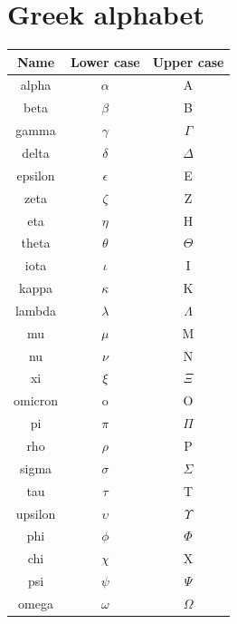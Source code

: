 \chapter{Greek alphabet}

\begin{tabular}{ |c|c|c| }
  \hline
  Name & Lower case & Upper case\\
  \hline
  alpha & $\alpha$ & A \\
	beta & $\beta$ & B\\
	gamma & $\gamma$ & $\Gamma$\\
	delta & $\delta$ & $\Delta$ \\
	epsilon & $\epsilon$ & E \\
	zeta & $\zeta$ & Z \\
	eta & $\eta$ & H \\
	theta & $\theta$ & $\Theta$ \\
	iota & $\iota$ & I \\
	kappa & $\kappa$ & K \\
	lambda & $\lambda$ & $\Lambda$ \\
	mu & $\mu$ & M\\
	nu & $\nu$ & N \\
	xi & $\xi$ & $\Xi$ \\
	omicron & o & O \\
	pi & $\pi$ & $\Pi$ \\
	rho & $\rho$ & P \\
	sigma & $\sigma$ & $\Sigma$ \\
	tau & $\tau$ & T \\
	upsilon & $\upsilon$ & $\Upsilon$ \\
	phi & $\phi$ & $\Phi$ \\
	chi & $\chi$ & X \\
	psi & $\psi$ & $\Psi$ \\
	omega & $\omega$ & $\Omega$ \\
	
	\hline
	\end{tabular}